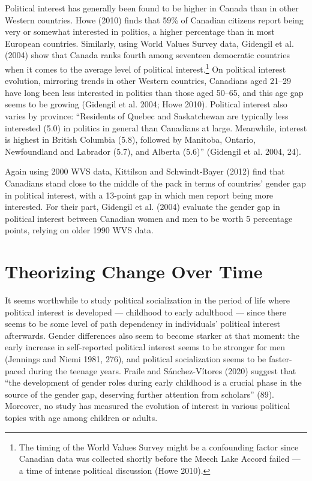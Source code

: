 \documentclass[
  letterpaper,
  DIV=11,
  numbers=noendperiod]{scrreprt}
\begin{document}
Political interest has generally been found to be higher in Canada than
in other Western countries. Howe (2010) finds that 59\% of Canadian
citizens report being very or somewhat interested in politics, a higher
percentage than in most European countries. Similarly, using World
Values Survey data, Gidengil et al. (2004) show that Canada ranks fourth
among seventeen democratic countries when it comes to the average level
of political interest.\footnote{The timing of the World Values Survey
  might be a confounding factor since Canadian data was collected
  shortly before the Meech Lake Accord failed --- a time of intense
  political discussion (Howe 2010).} On political interest evolution,
mirroring trends in other Western countries, Canadians aged 21--29 have
long been less interested in politics than those aged 50--65, and this
age gap seems to be growing (Gidengil et al. 2004; Howe 2010). Political
interest also varies by province: ``Residents of Quebec and Saskatchewan
are typically less interested (5.0) in politics in general than
Canadians at large. Meanwhile, interest is highest in British Columbia
(5.8), followed by Manitoba, Ontario, Newfoundland and Labrador (5.7),
and Alberta (5.6)'' (Gidengil et al. 2004, 24).

Again using 2000 WVS data, Kittilson and Schwindt-Bayer (2012) find that
Canadians stand close to the middle of the pack in terms of countries'
gender gap in political interest, with a 13-point gap in which men
report being more interested. For their part, Gidengil et al. (2004)
evaluate the gender gap in political interest between Canadian women and
men to be worth 5 percentage points, relying on older 1990 WVS data.

\section{Theorizing Change Over Time}\label{theorizing-change-over-time}

It seems worthwhile to study political socialization in the period of
life where political interest is developed --- childhood to early
adulthood --- since there seems to be some level of path dependency in
individuals' political interest afterwards. Gender differences also seem
to become starker at that moment: the early increase in self-reported
political interest seems to be stronger for men (Jennings and Niemi
1981, 276), and political socialization seems to be faster-paced during
the teenage years. Fraile and Sánchez-Vítores (2020) suggest that ``the
development of gender roles during early childhood is a crucial phase in
the source of the gender gap, deserving further attention from
scholars'' (89). Moreover, no study has measured the evolution of
interest in various political topics with age among children or adults.
\end{document}

